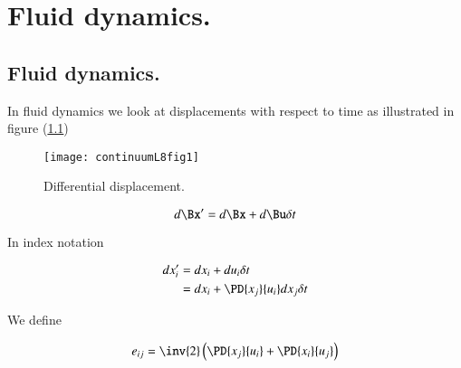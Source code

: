 %
%

\chapter{Fluid dynamics.}
\label{chap:continuumL8b}

\beginArtWithToc

%
%
\section{Fluid dynamics.}


In fluid dynamics we look at displacements with respect to time as illustrated in figure (\ref{fig:continuumL8:continuumL8fig1})
\begin{figure}[htp]
   \centering
   \texttt{[image: continuumL8fig1]}
   \caption{Differential displacement.}\label{fig:continuumL8:continuumL8fig1}
\end{figure}

\begin{equation}\label{eqn:continuumL8:230}
d\Bx' = d\Bx + d\Bu \delta t
\end{equation}

In index notation

\begin{align*}
dx_i'
&= dx_i + du_i \delta t \\
&= dx_i + \PD{x_j}{u_i} dx_j \delta t
\end{align*}

We define

\begin{equation}\label{eqn:continuumL8:250}
e_{ij} = \inv{2} \left(
\PD{x_j}{u_i} +
\PD{x_i}{u_j} \right)
\end{equation}

